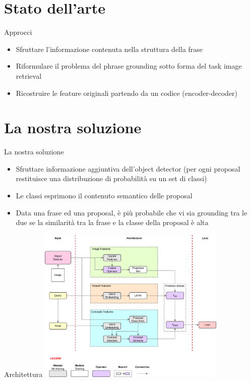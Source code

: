 \documentclass{beamer}
\begin{document}
\section{Stato dell'arte}

\begin{frame}{Approcci}
  \begin{itemize}
    \item Sfruttare l'informazione contenuta nella \alert{struttura
    della frase}
    \item Riformulare il problema del phrase grounding sotto forma del
    task \alert{image retrieval}
    \item \alert{Ricostruire} le feature originali partendo da un
    codice (encoder-decoder)
  \end{itemize}
\end{frame}

\section{La nostra soluzione}

\begin{frame}{La nostra soluzione}
  \begin{itemize}
    \item Sfruttare informazione aggiuntiva dell'object detector (per
    ogni proposal restituisce una \alert{distribuzione di probabilità}
    su un set di classi)
    \item Le classi esprimono il \alert{contenuto semantico} delle
    proposal
    \item Data una frase ed una proposal, è più probabile che vi sia
    grounding tra le due se la \alert{similarità} tra la frase e la
    classe della proposal è alta
  \end{itemize}
\end{frame}

\begin{frame}{Architettura}
  \centering
  \includegraphics[width=9cm]{images/model-architecture.png}
\end{frame}
\end{document}
